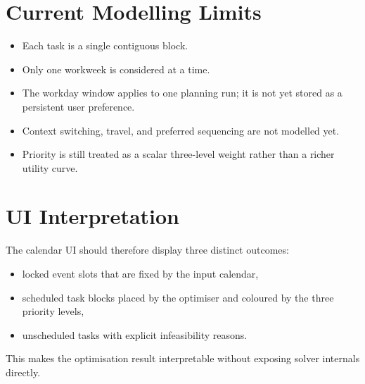 \documentclass[11pt]{article}
\begin{document}
\section{Current Modelling Limits}
\begin{itemize}
  \item Each task is a single contiguous block.
  \item Only one workweek is considered at a time.
  \item The workday window applies to one planning run; it is not yet stored as a persistent user preference.
  \item Context switching, travel, and preferred sequencing are not modelled yet.
  \item Priority is still treated as a scalar three-level weight rather than a richer utility curve.
\end{itemize}

\section{UI Interpretation}
The calendar UI should therefore display three distinct outcomes:
\begin{itemize}
  \item locked event slots that are fixed by the input calendar,
  \item scheduled task blocks placed by the optimiser and coloured by the three priority levels,
  \item unscheduled tasks with explicit infeasibility reasons.
\end{itemize}
This makes the optimisation result interpretable without exposing solver internals directly.
\end{document}
